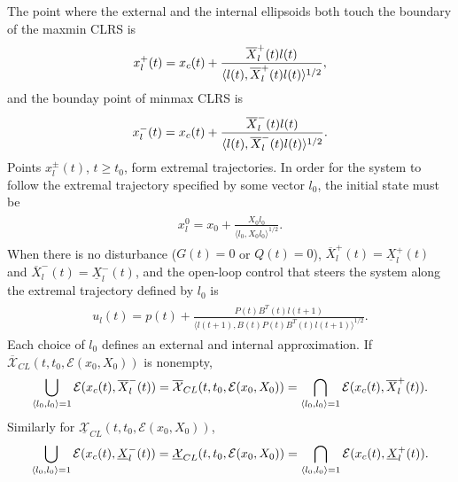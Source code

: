 \documentclass[letterpaper,10pt,english]{sphinxmanual}
\begin{document}
The point where the external and the internal ellipsoids both touch the
boundary of the maxmin CLRS is
\begin{gather}
\begin{split}x_l^+(t) = x_c(t) + \frac{\overline{X}^+_l(t)l(t)}{\langle l(t),
\overline{X}^+_l(t)l(t)\rangle^{1/2}} ,\end{split}\notag
\end{gather}
and the bounday point of minmax CLRS is
\begin{gather}
\begin{split}x_l^-(t) = x_c(t) + \frac{\overline{X}^-_l(t)l(t)}{\langle l(t),
\overline{X}^-_l(t)l(t)\rangle^{1/2}} .\end{split}\notag
\end{gather}
Points $x^{\pm}_l(t)$, $t\geqslant t_0$, form extremal
trajectories. In order for the system to follow the extremal trajectory
specified by some vector $l_0$, the initial state must be
\label{chap_reach:equation-dx01}\begin{gather}
\begin{split}x_l^0 = x_0 + \frac{X_0l_0}{\langle l_0, X_0l_0\rangle^{1/2}}.\end{split}\label{chap_reach-dx01}
\end{gather}
When there is no disturbance ($G(t)=0$ or $Q(t)=0$),
$\overline{X}^+_l(t)=\underline{X}^+_l(t)$ and
$\overline{X}^-_l(t)=\underline{X}^-_l(t)$, and the open-loop
control that steers the system along the extremal trajectory defined by
$l_0$ is
\label{chap_reach:equation-udt}\begin{gather}
\begin{split}u_l(t) = p(t) + \frac{P(t)B^T(t)l(t+1)}{\langle l(t+1),
B(t)P(t)B^T(t)l(t+1)\rangle^{1/2}}.\end{split}\label{chap_reach-udt}
\end{gather}
Each choice of $l_0$ defines an external and internal
approximation. If $\overline{{\mathcal X}}_{CL}(t,t_0,{\mathcal E}(x_0,X_0))$ is
nonempty,
\begin{gather}
\begin{split}\bigcup_{\langle l_0,l_0\rangle=1}{\mathcal E}(x_c(t),\overline{X}^-_l(t)) =
\overline{{\mathcal X}}_{CL}(t,t_0,{\mathcal E}(x_0,X_0)) =
\bigcap_{\langle l_0,l_0\rangle=1}{\mathcal E}(x_c(t),\overline{X}^+_l(t)).\end{split}\notag
\end{gather}
Similarly for
$\underline{{\mathcal X}}_{CL}(t,t_0,{\mathcal E}(x_0,X_0))$,
\begin{gather}
\begin{split}\bigcup_{\langle l_0,l_0\rangle=1}{\mathcal E}(x_c(t),\underline{X}^-_l(t)) =
\underline{{\mathcal X}}_{CL}(t,t_0,{\mathcal E}(x_0,X_0)) =
\bigcap_{\langle l_0,l_0\rangle=1}{\mathcal E}(x_c(t),\underline{X}^+_l(t)).\end{split}\notag
\end{gather}
\end{document}
